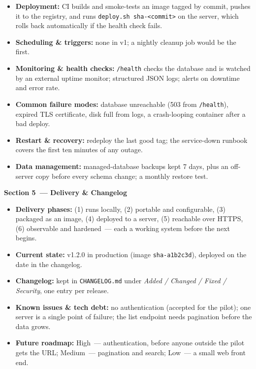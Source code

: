 \begin{itemize}
\tightlist
\item
  \textbf{Deployment:} CI builds and smoke-tests an image tagged by commit, pushes it to the registry, and runs \texttt{deploy.sh\ sha-\textless{}commit\textgreater{}} on the server, which rolls back automatically if the health check fails.
\item
  \textbf{Scheduling \& triggers:} none in v1; a nightly cleanup job would be the first.
\item
  \textbf{Monitoring \& health checks:} \texttt{/health} checks the database and is watched by an external uptime monitor; structured JSON logs; alerts on downtime and error rate.
\item
  \textbf{Common failure modes:} database unreachable (503 from \texttt{/health}), expired TLS certificate, disk full from logs, a crash-looping container after a bad deploy.
\item
  \textbf{Restart \& recovery:} redeploy the last good tag; the service-down runbook covers the first ten minutes of any outage.
\item
  \textbf{Data management:} managed-database backups kept 7 days, plus an off-server copy before every schema change; a monthly restore test.
\end{itemize}

\noindent{}\textbf{Section 5~--- Delivery \& Changelog}

\begin{itemize}
\tightlist
\item
  \textbf{Delivery phases:} (1) runs locally, (2) portable and configurable, (3) packaged as an image, (4) deployed to a server, (5) reachable over HTTPS, (6) observable and hardened~--- each a working system before the next begins.
\item
  \textbf{Current state:} v1.2.0 in production (image \texttt{sha-a1b2c3d}), deployed on the date in the changelog.
\item
  \textbf{Changelog:} kept in \texttt{CHANGELOG.md} under \emph{Added / Changed / Fixed / Security}, one entry per release.
\item
  \textbf{Known issues \& tech debt:} no authentication (accepted for the pilot); one server is a single point of failure; the list endpoint needs pagination before the data grows.
\item
  \textbf{Future roadmap:} High~--- authentication, before anyone outside the pilot gets the URL; Medium~--- pagination and search; Low~--- a small web front end.
\end{itemize}

